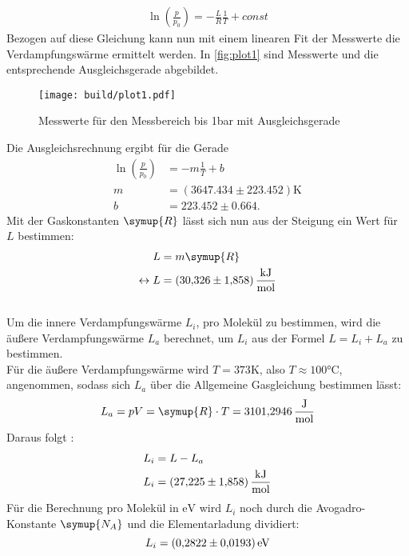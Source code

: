 \begin{align}
  \ln(\frac{p}{p_0})=- \frac{L}{R} \frac{1}{T}+const 
\end{align}
\noindent
Bezogen auf diese Gleichung kann nun mit einem linearen Fit der Messwerte die Verdampfungswärme ermittelt werden.
In \autoref{fig:plot1} sind Messwerte und die entsprechende Ausgleichsgerade abgebildet. 
\begin{figure}[H]
  \centering
  \texttt{[image: build/plot1.pdf]}
  \caption{Messwerte für den Messbereich bis 1\si[]{\bar} mit Ausgleichsgerade }
  \label{fig:plot1}
\end{figure}
\noindent
Die Ausgleichsrechnung ergibt für die Gerade
\begin{align}
  \ln(\frac{p}{p_0})&=- m \frac{1}{T}+b \\
  m&=(3647.434 \pm 223.452) \si{\kelvin}\\
  b&=223.452 \pm 0.664 .
\end{align}
Mit der Gaskonstanten $\symup{R}$ lässt sich nun aus der Steigung ein Wert für $L$ bestimmen:
\begin{align}
    L&=m  \symup{R} \\
    \leftrightarrow L&=\SI{30.326 \pm 1.858 }{\kilo\joule\per\mol} 
\end{align}\\
\noindent
Um die innere Verdampfungswärme $L_i$, pro Molekül zu bestimmen, wird die äußere Verdampfungswärme $L_a$ berechnet, um $L_i$ aus der Formel $L=L_i+L_a$ zu bestimmen.\\
Für die äußere Verdampfungswärme wird $T=373 \si{\kelvin}$, also $T\approx 100 \si{\celsius}$, angenommen, sodass sich $L_a$ über die Allgemeine Gasgleichung bestimmen lässt:
\begin{equation}
    L_a=pV=\symup{R} \cdot T = \SI{3101.2946}{\joule\per\mol} 
\end{equation}
Daraus folgt :
\begin{align}
    L_i&=L-L_a \\
    L_i&=\SI{27.225\pm 1.858 }{\kilo\joule\per\mol}
\end{align}
Für die Berechnung pro Molekül in $\si{\electronvolt}$ wird $L_i$ noch durch die Avogadro-Konstante $\symup{N_A}$ und die Elementarladung dividiert:
\begin{equation}
    L_i=\SI{0.2822 \pm 0.0193}{\electronvolt} 
\end{equation}

